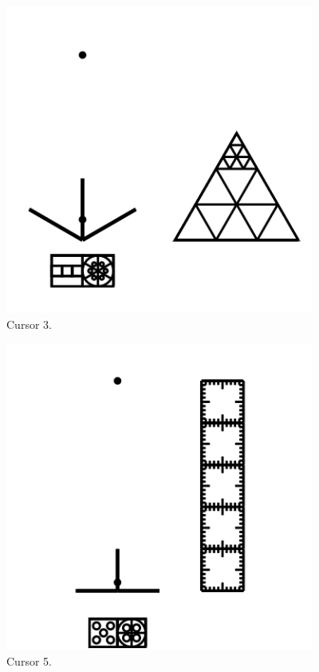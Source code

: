 \begin{figure}
	\centering
	\includegraphics[width=4in]{figures/web2d/cursor3.png}
	\caption[cursor3]
	{Cursor 3.}
\end{figure}
\begin{figure}
	\centering
	\includegraphics[width=4in]{figures/web2d/cursor5.png}
	\caption[cursor5]
	{Cursor 5.}
\end{figure}





